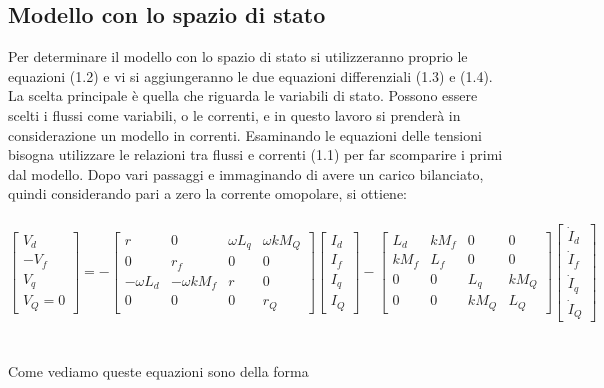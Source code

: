 \documentclass[Lau,noexaminfo]{sapthesis}
\begin{document}
	\subsection{Modello con lo spazio di stato}Per determinare il modello con lo spazio di stato si utilizzeranno proprio le equazioni (1.2) e vi si aggiungeranno le due equazioni differenziali (1.3) e (1.4). La scelta principale è quella che riguarda le variabili di stato. Possono essere scelti i flussi come variabili, o le correnti, e in questo lavoro si prenderà in considerazione un modello in correnti. Esaminando le equazioni delle tensioni bisogna utilizzare le relazioni tra flussi e correnti (1.1) per far scomparire i primi dal modello. Dopo vari passaggi e immaginando di avere un carico bilanciato, quindi considerando pari a zero la corrente omopolare, si ottiene:\\\\
	$\begin{bmatrix}
	V_d \\
	-V_f \\
	V_q \\
	V_Q=0
	\end{bmatrix}=
	-\begin{bmatrix}
	r & 0 & \omega L_q & \omega kM_Q \\
	0 & r_f & 0 & 0\\
	-\omega L_d & -\omega kM_f & r & 0\\
	0 & 0 & 0 & r_Q
	\end{bmatrix}
	\begin{bmatrix}
	I_d\\
	I_f\\
	I_q\\
	I_Q
	\end{bmatrix}
	-\begin{bmatrix}
	L_d & kM_f & 0 & 0\\
	kM_f & L_f & 0 & 0\\
	0 & 0 & L_q &  kM_Q\\
	0 & 0 & kM_Q & L_Q
	\end{bmatrix} \begin{bmatrix}
	\dot{I}_d\\
	\dot{I}_f\\
	\dot{I}_q\\
	\dot{I}_Q
	\end{bmatrix} $\\
	\\\\
	Come vediamo queste equazioni sono della forma\\
\end{document}
